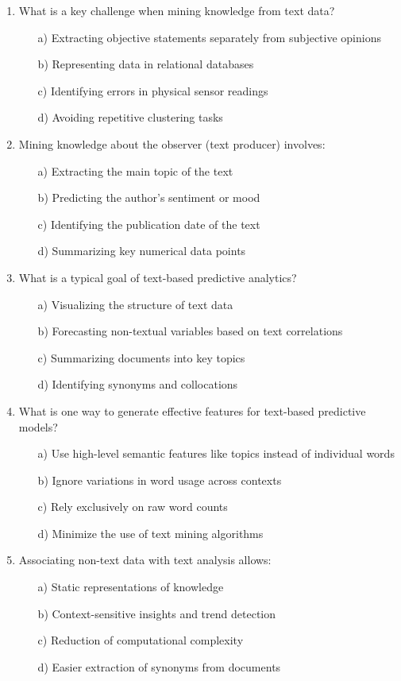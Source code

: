 \documentclass[8pt]{extarticle}
\begin{document}
\begin{multicols}{2}
\begin{enumerate}
\item What is a key challenge when mining knowledge from text data?
\begin{itemize}
\item[a)] Extracting objective statements separately from subjective opinions
\item[b)] Representing data in relational databases
\item[c)] Identifying errors in physical sensor readings
\item[d)] Avoiding repetitive clustering tasks
\end{itemize}

\item Mining knowledge about the observer (text producer) involves:
\begin{itemize}
\item[a)] Extracting the main topic of the text
\item[b)] Predicting the author's sentiment or mood
\item[c)] Identifying the publication date of the text
\item[d)] Summarizing key numerical data points
\end{itemize}

\item What is a typical goal of text-based predictive analytics?
\begin{itemize}
\item[a)] Visualizing the structure of text data
\item[b)] Forecasting non-textual variables based on text correlations
\item[c)] Summarizing documents into key topics
\item[d)] Identifying synonyms and collocations
\end{itemize}

\item What is one way to generate effective features for text-based predictive models?
\begin{itemize}
\item[a)] Use high-level semantic features like topics instead of individual words
\item[b)] Ignore variations in word usage across contexts
\item[c)] Rely exclusively on raw word counts
\item[d)] Minimize the use of text mining algorithms
\end{itemize}

\item Associating non-text data with text analysis allows:
\begin{itemize}
\item[a)] Static representations of knowledge
\item[b)] Context-sensitive insights and trend detection
\item[c)] Reduction of computational complexity
\item[d)] Easier extraction of synonyms from documents
\end{itemize}


\end{enumerate}
\end{multicols}
\end{document}
